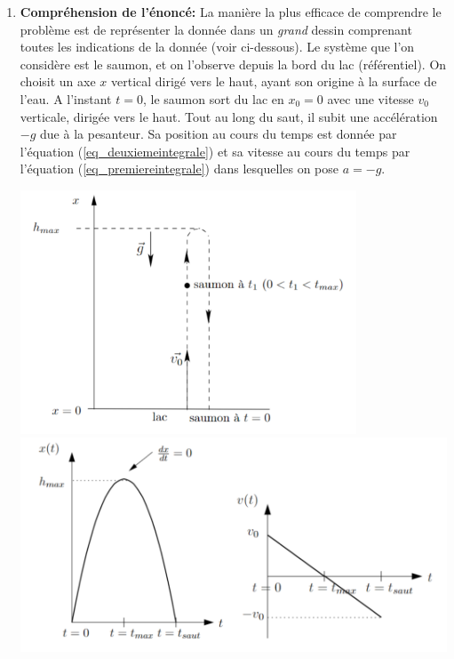 \begin{enumerate}
\item \textbf{Compr\'ehension de l'\'enonc\'e:} La mani\`ere la plus efficace de comprendre le probl\`eme est de repr\'esenter la donn\'ee dans un \emph{grand} dessin comprenant toutes les indications de la donnée (voir ci-dessous). Le système que l'on considère est le saumon, et on l'observe depuis la bord du lac (référentiel). On choisit un axe $x$ vertical dirigé vers le haut, ayant son origine à la surface de l'eau.
 A l'instant $t=0$, le saumon sort du lac en $x_0=0$ avec une vitesse $v_0$ verticale, dirig\'ee vers le haut. Tout au long du saut, il subit une acc\'el\'eration $-g$ due \`a la pesanteur. Sa position au cours du temps est donn\'ee par l'\'equation (\eqref{eq_deuxiemeintegrale}) et sa vitesse au cours du temps par l'\'equation (\eqref{eq_premiereintegrale}) dans lesquelles on pose $a=-g$. 
\begin{center}
\hspace*{15mm}
\includegraphics[width=10cm]{figures//serie01_c_fig1-2b.pdf}
\includegraphics[width=14cm]{figures//serie01_c_fig1-2c.pdf}
\end{center}
\vspace{0.9cm}


\end{enumerate}
